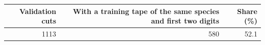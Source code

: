 \begin{tabular}{rrr}
\toprule
Validation cuts & With a training tape of the same species and first two digits & Share (\%) \\
\midrule
1113 & 580 & 52.1 \\
\bottomrule
\end{tabular}
